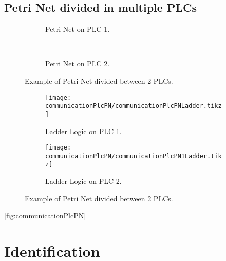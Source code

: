 \subsection{Petri Net divided in multiple PLCs}
\label{sec:multiplePlcs}

\begin{figure}[H]
  \centering
  \begin{subfigure}[t]{0.5\textwidth}
    \center
    \caption{Petri Net on PLC 1.}
    \label{fig:communicationPlcPN}
  \end{subfigure}%
  ~
  \begin{subfigure}[t]{0.5\textwidth}
    \centering
    \caption{Petri Net on PLC 2.}
    \label{fig:communicationPlcPN1}
  \end{subfigure}
  \caption{Example of Petri Net divided between 2 PLCs.}
\end{figure}


\begin{figure}[H]
  \centering
  \begin{subfigure}[t]{0.45\textwidth}
    \centering
    \texttt{[image: communicationPlcPN/communicationPlcPNLadder.tikz]}
    \caption{Ladder Logic on PLC 1.}
    \label{fig:communicationPlcPN}
  \end{subfigure}%
  \hfill
  \begin{subfigure}[t]{0.45\textwidth}
    \centering
    \texttt{[image: communicationPlcPN/communicationPlcPN1Ladder.tikz]}
    \caption{Ladder Logic on PLC 2.}
    \label{fig:communicationPlcPN1}
  \end{subfigure}
  \caption{Example of Petri Net divided between 2 PLCs.}
\end{figure}
  

\autoref{fig:communicationPlcPN}

\section{Identification}
\label{sec:identification}



